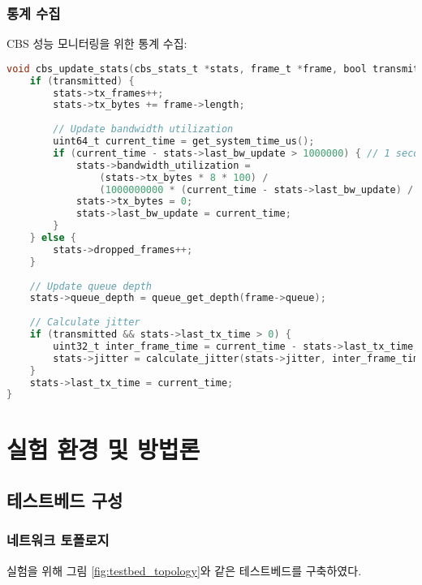 \documentclass[twocolumn,10pt]{article}
\begin{document}
\subsubsection{통계 수집}

CBS 성능 모니터링을 위한 통계 수집:

\begin{lstlisting}[language=C, caption=통계 수집 구현]
void cbs_update_stats(cbs_stats_t *stats, frame_t *frame, bool transmitted) {
    if (transmitted) {
        stats->tx_frames++;
        stats->tx_bytes += frame->length;
        
        // Update bandwidth utilization
        uint64_t current_time = get_system_time_us();
        if (current_time - stats->last_bw_update > 1000000) { // 1 second
            stats->bandwidth_utilization = 
                (stats->tx_bytes * 8 * 100) / 
                (1000000000 * (current_time - stats->last_bw_update) / 1000000);
            stats->tx_bytes = 0;
            stats->last_bw_update = current_time;
        }
    } else {
        stats->dropped_frames++;
    }
    
    // Update queue depth
    stats->queue_depth = queue_get_depth(frame->queue);
    
    // Calculate jitter
    if (transmitted && stats->last_tx_time > 0) {
        uint32_t inter_frame_time = current_time - stats->last_tx_time;
        stats->jitter = calculate_jitter(stats->jitter, inter_frame_time);
    }
    stats->last_tx_time = current_time;
}
\end{lstlisting}

\section{실험 환경 및 방법론}
\label{sec:experiment}

\subsection{테스트베드 구성}

\subsubsection{네트워크 토폴로지}

실험을 위해 그림 \ref{fig:testbed_topology}와 같은 테스트베드를 구축하였다.
\end{document}
